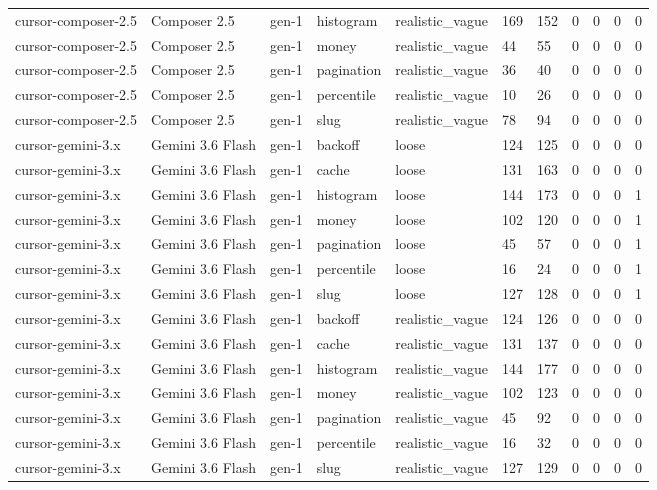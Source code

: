 \begin{tabular}{lllllllllll}
cursor-composer-2.5 & Composer 2.5 & gen-1 & histogram & realistic\_vague & 169 & 152 & 0 & 0 & 0 & 0 \\
cursor-composer-2.5 & Composer 2.5 & gen-1 & money & realistic\_vague & 44 & 55 & 0 & 0 & 0 & 0 \\
cursor-composer-2.5 & Composer 2.5 & gen-1 & pagination & realistic\_vague & 36 & 40 & 0 & 0 & 0 & 0 \\
cursor-composer-2.5 & Composer 2.5 & gen-1 & percentile & realistic\_vague & 10 & 26 & 0 & 0 & 0 & 0 \\
cursor-composer-2.5 & Composer 2.5 & gen-1 & slug & realistic\_vague & 78 & 94 & 0 & 0 & 0 & 0 \\
cursor-gemini-3.x & Gemini 3.6 Flash & gen-1 & backoff & loose & 124 & 125 & 0 & 0 & 0 & 0 \\
cursor-gemini-3.x & Gemini 3.6 Flash & gen-1 & cache & loose & 131 & 163 & 0 & 0 & 0 & 0 \\
cursor-gemini-3.x & Gemini 3.6 Flash & gen-1 & histogram & loose & 144 & 173 & 0 & 0 & 0 & 1 \\
cursor-gemini-3.x & Gemini 3.6 Flash & gen-1 & money & loose & 102 & 120 & 0 & 0 & 0 & 1 \\
cursor-gemini-3.x & Gemini 3.6 Flash & gen-1 & pagination & loose & 45 & 57 & 0 & 0 & 0 & 1 \\
cursor-gemini-3.x & Gemini 3.6 Flash & gen-1 & percentile & loose & 16 & 24 & 0 & 0 & 0 & 1 \\
cursor-gemini-3.x & Gemini 3.6 Flash & gen-1 & slug & loose & 127 & 128 & 0 & 0 & 0 & 1 \\
cursor-gemini-3.x & Gemini 3.6 Flash & gen-1 & backoff & realistic\_vague & 124 & 126 & 0 & 0 & 0 & 0 \\
cursor-gemini-3.x & Gemini 3.6 Flash & gen-1 & cache & realistic\_vague & 131 & 137 & 0 & 0 & 0 & 0 \\
cursor-gemini-3.x & Gemini 3.6 Flash & gen-1 & histogram & realistic\_vague & 144 & 177 & 0 & 0 & 0 & 0 \\
cursor-gemini-3.x & Gemini 3.6 Flash & gen-1 & money & realistic\_vague & 102 & 123 & 0 & 0 & 0 & 0 \\
cursor-gemini-3.x & Gemini 3.6 Flash & gen-1 & pagination & realistic\_vague & 45 & 92 & 0 & 0 & 0 & 0 \\
cursor-gemini-3.x & Gemini 3.6 Flash & gen-1 & percentile & realistic\_vague & 16 & 32 & 0 & 0 & 0 & 0 \\
cursor-gemini-3.x & Gemini 3.6 Flash & gen-1 & slug & realistic\_vague & 127 & 129 & 0 & 0 & 0 & 0 \\

\end{tabular}
